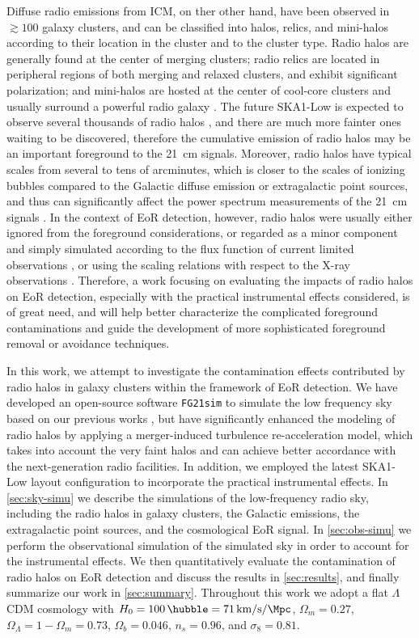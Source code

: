 \documentclass[modern]{aastex62}
\newcommand{\lcdm}{$\Lambda$CDM}
\begin{document}
Diffuse radio emissions from ICM, on ther other hand, have been
observed in $\gtrsim 100$ galaxy clusters, and can be classified into
halos, relics, and mini-halos according to their location in the cluster
and to the cluster type.
Radio halos are generally found at the center of merging clusters;
radio relics are located in peripheral regions of both merging and
relaxed clusters, and exhibit significant polarization;
and mini-halos are hosted at the center of cool-core clusters and
usually surround a powerful radio galaxy
\citep[see][for reviews]{feretti2012rev,kale2016rev}.
The future SKA1-Low is expected to observe several
thousands of radio halos \citep{cassano2015}, and there are much more
fainter ones waiting to be discovered, therefore the cumulative emission
of radio halos may be an important foreground to the 21~cm signals.
Moreover, radio halos have typical scales from several to tens of
arcminutes, which is closer to the scales of ionizing bubbles
compared to the Galactic diffuse emission or extragalactic point sources,
and thus can significantly affect the power spectrum measurements of the
21~cm signals \citep[e.g.,][]{diMatteo2004}.
In the context of EoR detection, however, radio halos were usually
either ignored from the foreground considerations, or regarded as
a minor component and simply simulated according to the flux function
of current limited observations \citep[e.g.,][]{gleser2008},
or using the scaling relations with respect to the X-ray observations
\citep[e.g.,][]{jelic2008}.
Therefore, a work focusing on evaluating the impacts of radio halos
on EoR detection, especially with the practical instrumental effects
considered, is of great need,
and will help better characterize the complicated foreground contaminations
and guide the development of more sophisticated foreground removal or
avoidance techniques.

In this work, we attempt to investigate the contamination effects
contributed by radio halos in galaxy clusters within the framework of
EoR detection.
We have developed an open-source software \texttt{FG21sim}
to simulate the low frequency sky based on our previous works
\citep{wang2010,wang2013}, but have significantly enhanced the modeling
of radio halos by applying a merger-induced turbulence re-acceleration model,
which takes into account the very faint halos and can achieve better
accordance with the next-generation radio facilities.
In addition, we employed the latest SKA1-Low layout configuration to
incorporate the practical instrumental effects.
In \autoref{sec:sky-simu} we describe the simulations of the low-frequency
radio sky, including the radio halos in galaxy clusters, the Galactic
emissions, the extragalactic point sources, and the cosmological EoR signal.
In \autoref{sec:obs-simu} we perform the observational simulation of the
simulated sky in order to account for the instrumental effects.
We then quantitatively evaluate the contamination of radio halos on EoR
detection and discuss the results in \autoref{sec:results},
and finally summarize our work in \autoref{sec:summary}.
Throughout this work we adopt a flat \lcdm{} cosmology with
$H_0 = \SI{100}{\hubble} = \SI{71}{\km\per\second\per\Mpc}$,
$\Omega_m = 0.27$, $\Omega_{\Lambda} = 1 - \Omega_m = 0.73$,
$\Omega_b = 0.046$, $n_s = 0.96$, and $\sigma_8 = 0.81$.
\end{document}
